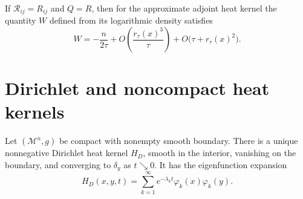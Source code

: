 \begin{lemma}
\label{lem:chow-iii-adjoint-parametrix-ricci-asymptotics}
If \(\mathcal R_{ij}=R_{ij}\) and \(Q=R\), then for the approximate adjoint
heat kernel the quantity \(W\) defined from its logarithmic density satisfies
\[
 W=-\frac{n}{2\tau}
 +O\!\left(\frac{r_\tau(x)^3}{\tau}\right)
 +O\bigl(\tau+r_\tau(x)^2\bigr).
\]
\end{lemma}

\section{Dirichlet and noncompact heat kernels}

\begin{theorem}
\label{thm:chow-iii-static-dirichlet-heat-kernel}
Let \((\mathcal M^n,g)\) be compact with nonempty smooth boundary.  There is a
unique nonnegative Dirichlet heat kernel \(H_D\), smooth in the interior,
vanishing on the boundary, and converging to \(\delta_y\) as \(t\searrow0\).
It has the eigenfunction expansion
\[
 H_D(x,y,t)=\sum_{k=1}^\infty e^{-\lambda_kt}\varphi_k(x)\varphi_k(y).
\]
\end{theorem}

